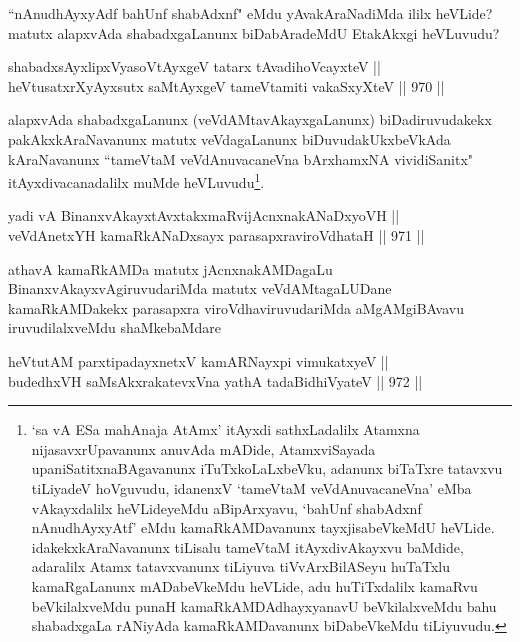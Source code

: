 \begin{artha}
``nAnudhAyxyAdf bahUnf shabAdxnf" eMdu yAvakAraNadiMda ililx heVLide? matutx alapxvAda shabadxgaLanunx biDabAradeMdU EtakAkxgi heVLuvudu?
\end{artha}


\begin{shl}
shabadxsAyxlipxVyasoV\s tAyxgeV tatarx tAvadihoVcayxteV || \\
heVtusatxrXyAyxsutx saMtAyxgeV tameVtamiti vakaSxyXteV \hfill || 970 ||  
\end{shl}

\begin{artha}
alapxvAda shabadxgaLanunx (veVdAMtavAkayxgaLanunx) biDadiruvudakekx pakAkxkAraNavanunx matutx veVdagaLanunx biDuvudakUkxbeVkAda kAraNavanunx ``tameVtaM veVdAnuvacaneVna bArxhamxNA vividiSanitx" itAyxdivacanadalilx muMde heVLuvudu\footnote{`sa vA ESa mahAnaja AtAmx' itAyxdi sathxLadalilx Atamxna nijasavxrUpavanunx anuvAda mADide, AtamxviSayada upaniSatitxnaBAgavanunx iTuTxkoLaLxbeVku, adanunx biTaTxre tatavxvu tiLiyadeV hoVguvudu, idanenxV `tameVtaM veVdAnuvacaneVna' eMba vAkayxdalilx heVLideyeMdu aBipArxyavu, `bahUnf shabAdxnf nAnudhAyxyAtf' eMdu kamaRkAMDavanunx tayxjisabeVkeMdU heVLide. idakekxkAraNavanunx tiLisalu tameVtaM itAyxdivAkayxvu baMdide, adaralilx Atamx tatavxvanunx tiLiyuva tiVvArxBilASeyu huTaTxlu kamaRgaLanunx mADabeVkeMdu heVLide, adu huTiTxdalilx kamaRvu beVkilalxveMdu punaH kamaRkAMDAdhayxyanavU beVkilalxveMdu bahu shabadxgaLa rANiyAda kamaRkAMDavanunx biDabeVkeMdu tiLiyuvudu.}.
\end{artha}


\begin{shl}
yadi vA BinanxvAkayxtAvxtakxmaRvijAcnxnakANaDxyoVH || \\
veVdAnetxYH kamaRkANaDxsayx parasapxraviroVdhataH \hfill || 971 ||  
\end{shl}

\begin{artha}
athavA kamaRkAMDa matutx jAcnxnakAMDagaLu BinanxvAkayxvAgiruvudariMda matutx veVdAMtagaLUDane kamaRkAMDakekx parasapxra viroVdhaviruvudariMda aMgAMgiBAvavu iruvudilalxveMdu shaMkebaMdare\ndash 
\end{artha}


\begin{shl}
heVtutAM parxtipadayxnetxV kamARNayxpi vimukatxyeV || \\
budedhxVH saMsAkxrakatevxVna yathA tadaBidhiVyateV \hfill || 972 ||  
\end{shl}

